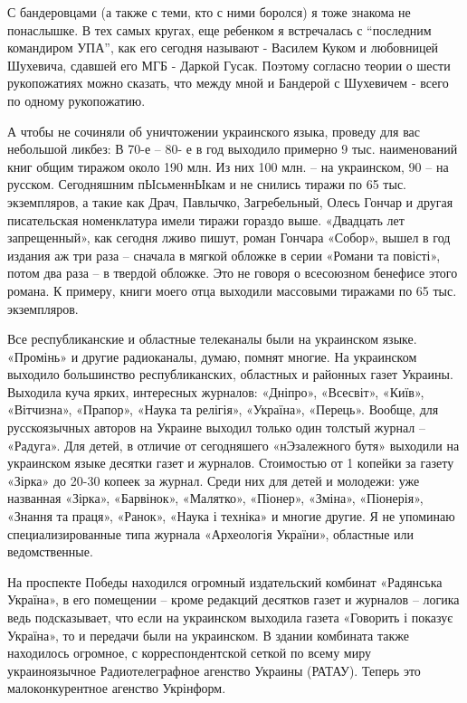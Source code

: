 С бандеровцами (а также с теми, кто с ними боролся) я тоже знакома не
понаслышке. В тех самых кругах, еще ребенком я встречалась с \enquote{последним
командиром УПА}, как его сегодня называют - Василем Куком и любовницей
Шухевича, сдавшей его МГБ - Даркой Гусак. Поэтому согласно теории о шести
рукопожатиях можно сказать, что между мной и Бандерой с Шухевичем - всего по
одному рукопожатию.

А чтобы  не сочиняли об уничтожении украинского языка, проведу для вас
небольшой ликбез: В 70-е – 80- е в год выходило примерно 9 тыс. наименований
книг общим тиражом около 190 млн. Из них 100 млн. – на украинском, 90 – на
русском. Сегодняшним пЫсьменнЫкам и не снились тиражи по 65 тыс. экземпляров,
а такие как Драч, Павлычко, Загребельный, Олесь Гончар и другая писательская
номенклатура имели тиражи гораздо выше. «Двадцать лет запрещенный», как
сегодня лживо пишут, роман Гончара «Собор», вышел в год издания аж три раза –
сначала в мягкой обложке в серии «Романи та повісті», потом два раза – в
твердой обложке. Это не говоря о всесоюзном бенефисе этого романа. К примеру,
книги моего отца выходили массовыми тиражами по 65 тыс. экземпляров.

Все республиканские и областные телеканалы были на украинском языке. «Промінь»
и другие радиоканалы, думаю, помнят многие. На украинском выходило большинство
республиканских, областных и районных газет Украины. Выходила куча ярких,
интересных журналов: «Дніпро», «Всесвіт», «Київ», «Вітчизна», «Прапор», «Наука
та релігія», «Україна», «Перець». Вообще, для русскоязычных авторов на Украине
выходил только один толстый журнал – «Радуга». Для детей, в отличие от
сегодняшего «нЭзалежного бутя» выходили на украинском языке десятки газет и
журналов. Стоимостью от 1 копейки за газету «Зірка» до 20-30 копеек за журнал.
Среди них для детей и молодежи: уже названная «Зірка», «Барвінок», «Малятко»,
«Піонер», «Зміна», «Піонерія», «Знання та праця», «Ранок», «Наука і техніка» и
многие другие. Я не упоминаю специализированные типа журнала «Археологія
України», областные или ведомственные.

На проспекте Победы находился огромный издательский комбинат «Радянська
Україна», в его помещении – кроме редакций десятков газет и журналов – логика
ведь подсказывает, что если на украинском выходила газета «Говорить і показує
Україна», то и передачи были на украинском. В здании комбината также находилось
огромное, с корреспондентской сеткой по всему миру украиноязычное
Радиотелеграфное агенство Украины (РАТАУ). Теперь это малоконкурентное агенство
Укрінформ.

